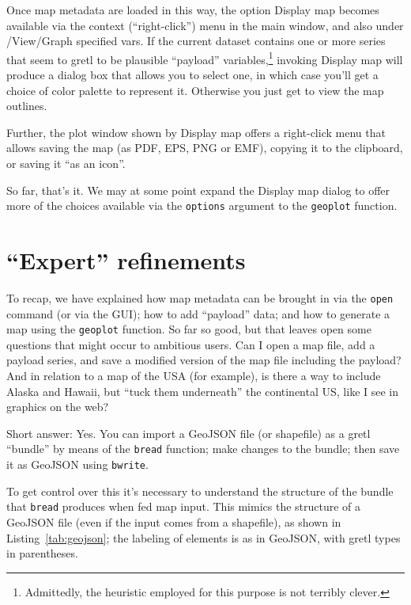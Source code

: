 \documentclass{article}
\begin{document}
Once map metadata are loaded in this way, the option \textsf{Display
  map} becomes available via the context (``right-click'') menu in the
main window, and also under \textsf{/View/Graph specified vars}. If
the current dataset contains one or more series that seem to gretl to
be plausible ``payload'' variables,\footnote{Admittedly, the heuristic
  employed for this purpose is not terribly clever.} invoking
\textsf{Display map} will produce a dialog box that allows you to
select one, in which case you'll get a choice of color palette to
represent it. Otherwise you just get to view the map outlines.

Further, the plot window shown by \textsf{Display map} offers a
right-click menu that allows saving the map (as PDF, EPS, PNG or EMF),
copying it to the clipboard, or saving it ``as an icon''.

So far, that's it. We may at some point expand the \textsf{Display
  map} dialog to offer more of the choices available via the
\texttt{options} argument to the \texttt{geoplot}
function.

\section{``Expert'' refinements}
\label{sec:expert}

To recap, we have explained how map metadata can be brought in via the
\texttt{open} command (or via the GUI); how to add ``payload'' data;
and how to generate a map using the \texttt{geoplot} function. So far
so good, but that leaves open some questions that might occur to
ambitious users.  Can I open a map file, add a payload series, and
save a modified version of the map file including the payload? And in
relation to a map of the USA (for example), is there a way to include
Alaska and Hawaii, but ``tuck them underneath'' the continental US,
like I see in graphics on the web?

Short answer: Yes. You can import a GeoJSON file (or shapefile) as a
gretl ``bundle'' by means of the \texttt{bread} function; make changes
to the bundle; then save it as GeoJSON using \texttt{bwrite}.

To get control over this it's necessary to understand the structure of
the bundle that \texttt{bread} produces when fed map input. This
mimics the structure of a GeoJSON file (even if the input comes from a
shapefile), as shown in Listing~\ref{tab:geojson}; the labeling of
elements is as in GeoJSON, with gretl types in parentheses.
\end{document}
